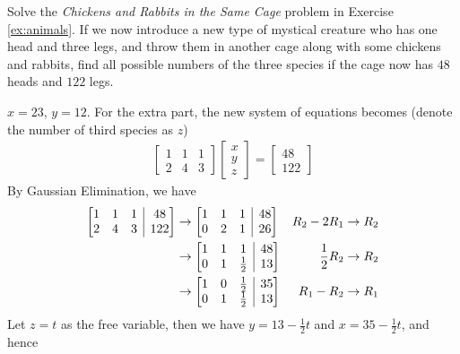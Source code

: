 \begin{Exercise}
Solve the \textit{Chickens and Rabbits in the Same Cage} problem in Exercise \ref{ex:animals}. If we now introduce a new type of mystical creature who has one head and three legs, and throw them in another cage along with some chickens and rabbits, find all possible numbers of the three species if the cage now has $48$ heads and $122$ legs.
\end{Exercise}
\begin{Answer}
$x = 23$, $y = 12$. For the extra part, the new system of equations becomes (denote the number of third species as $z$)
\begin{align*}
\begin{bmatrix}
1 & 1 & 1 \\
2 & 4 & 3
\end{bmatrix}
\begin{bmatrix}
x \\
y \\
z
\end{bmatrix}
=
\begin{bmatrix}
48 \\
122
\end{bmatrix}
\end{align*}
By Gaussian Elimination, we have
\begin{align*}
\left[
\begin{array}{@{}ccc|c@{}}
1 & 1 & 1 & 48 \\
2 & 4 & 3 & 122
\end{array}
\right]
&\to
\left[
\begin{array}{@{}ccc|c@{}}
1 & 1 & 1 & 48 \\
0 & 2 & 1 & 26
\end{array}
\right] & R_2 - 2R_1 \to R_2 \\
&\to
\left[
\begin{array}{@{}ccc|c@{}}
1 & 1 & 1 & 48 \\
0 & 1 & \frac{1}{2} & 13
\end{array}
\right] & \frac{1}{2}R_2 \to R_2 \\
&\to
\left[
\begin{array}{@{}ccc|c@{}}
1 & 0 & \frac{1}{2} & 35 \\
0 & 1 & \frac{1}{2} & 13
\end{array}
\right] & R_1 - R_2 \to R_1
\end{align*}
Let $z = t$ as the free variable, then we have $y = 13 - \frac{1}{2}t$ and $x = 35-\frac{1}{2}t$, and hence
\begin{align*}

\end{align*}
\end{Answer}
